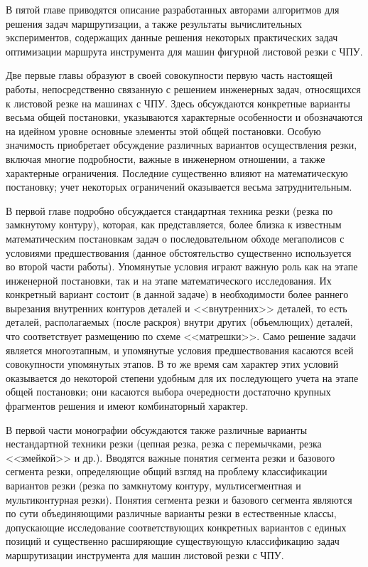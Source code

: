 \documentclass[11pt,twoside,openany]{report}
\begin{document}
В пятой главе приводятся описание разработанных авторами
алгоритмов для решения задач маршрутизации,
а также результаты вычислительных экспериментов,
содержащих данные решения некоторых практических
задач оптимизации маршрута инструмента для машин
фигурной листовой резки с ЧПУ.

Две первые главы образуют в своей совокупности
первую часть настоящей работы,
непосредственно связанную с решением инженерных задач,
относящихся к листовой резке на машинах с ЧПУ.
Здесь обсуждаются конкретные варианты весьма общей постановки,
указываются характерные
особенности
и обозначаются
на идейном уровне основные элементы этой общей постановки.
Особую значимость приобретает обсуждение
различных вариантов осуществления резки,
включая многие подробности,
важные в инженерном отношении,
а также характерные ограничения.
Последние существенно влияют на математическую постановку;
учет некоторых ограничений оказывается весьма затруднительным.

В первой главе подробно обсуждается
стандартная техника резки (резка по замкнутому контуру),
которая, как представляется,
более близка к известным математическим постановкам задач
о последовательном обходе мегаполисов с условиями предшествования
(данное обстоятельство существенно используется во второй части работы).
Упомянутые условия играют важную роль как на этапе инженерной постановки,
так и на этапе математического исследования.
Их конкретный вариант состоит (в данной задаче)
в необходимости более раннего вырезания внутренних контуров
деталей и <<внутренних>> деталей, то есть деталей,
располагаемых (после раскроя) внутри других (объемлющих) деталей,
что соответствует размещению по схеме <<матрешки>>.
Само решение задачи является многоэтапным,
и упомянутые
условия предшествования касаются всей совокупности упомянутых этапов.
В то же время сам характер этих условий оказывается
до некоторой степени удобным для их последующего учета
на этапе общей постановки;
они касаются выбора очередности достаточно
крупных фрагментов решения и имеют комбинаторный характер.

В первой части монографии обсуждаются также
различные варианты нестандартной техники резки
(цепная резка, резка с перемычками, резка <<змейкой>> и др.).
Вводятся важные понятия сегмента резки и базового сегмента резки,
определяющие общий взгляд на проблему классификации вариантов резки
(резка по замкнутому контуру, мультисегментная и мультиконтурная резки).
Понятия сегмента резки и базового сегмента являются
по сути объединяющими различные варианты резки в естественные классы,
допускающие исследование соответствующих конкретных вариантов
с единых позиций и существенно расширяющие существующую
классификацию задач маршрутизации инструмента
для машин листовой резки с ЧПУ.
\end{document}
